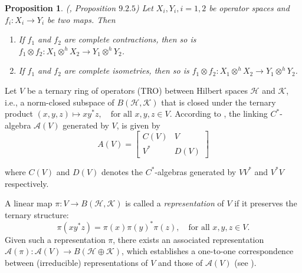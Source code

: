 \documentclass{birkjour}
\newtheorem{prop}[thm]{Proposition}
\theoremstyle{definition}
\theoremstyle{remark}
\numberwithin{equation}{section}
\begin{document}
 \begin{prop}
    (\cite{ER}, Proposition $9.2.5$) Let $X_i, Y_i, i= 1, 2$ be operator spaces and $f_i: X_i \to Y_i$ be two maps. Then 

     \begin{enumerate}
         \item If $f_1$ and $f_2$ are complete contractions, then so is $f_1 \otimes f_2 : X_1 \otimes^h X_2 \to Y_1 \otimes^h Y_2$. 
         \item If $f_1$ and $f_2$ are complete isometries, then so is $f_1 \otimes f_2 : X_1 \otimes^h X_2 \to Y_1 \otimes^h Y_2$. 
     \end{enumerate}
 \end{prop}

 




Let $V$ be a ternary ring of operators (TRO) between Hilbert spaces $\mathcal{H}$ and $\mathcal{K}$, i.e., a norm-closed subspace of $B(\mathcal{H}, \mathcal{K})$ that is closed under the ternary product $(x, y, z) \mapsto xy^*z, \quad \text{for all } x, y, z \in V$.  According to  \cite{MHA}, the  linking $C^{\ast}$-algebra $\mathcal{A}(V)$ generated by $V$, is given by $$A(V)=
\begin{bmatrix}
    C(V)       & V\\
    V^*   & D(V)
\end{bmatrix}$$
 
where $C(V)$ and $D(V)$ denotes the $C^{\ast}$-algebras generated by $VV^*$ and $V^*V$ respectively. 

A linear map $\pi: V \to B(\mathcal{H}, \mathcal{K})$ is called a \emph{representation} of $V$ if it preserves the ternary structure:
\[
\pi(xy^*z) = \pi(x)\pi(y)^{*}\pi(z), \quad \text{for all } x, y, z \in V.
\]
Given such a representation $\pi$, there exists an associated representation $\mathcal{A}(\pi): \mathcal{A}(V) \to B(\mathcal{H} \oplus \mathcal{K})$, which establishes a one-to-one correspondence between (irreducible) representations of $V$ and those of $\mathcal{A}(V)$ (see \cite{AAV}).
\end{document}
